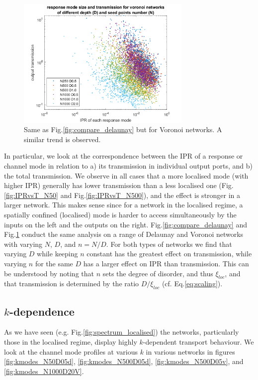 \begin{figure}[hbp]
  \centering
    \includegraphics[width=0.75\textwidth]{ch3/fig3/compare_voronoi.png}
    \caption{Same as Fig.\ref{fig:compare_delaunay} but for Voronoi networks. A similar trend is observed.} 
    \label{fig:compare_voronoi}
\end{figure}

In particular, we look at the correspondence between the IPR of a response or channel mode in relation to a) its transmission in individual output ports, and b) the total transmission. We observe in all cases that a more localised mode (with higher IPR) generally has lower transmission than a less localised one (Fig.\ref{fig:IPRvsT_N50} and Fig.\ref{fig:IPRvsT_N500}), and the effect is stronger in a larger network. This makes sense since for a network in the localised regime, a spatially confined (localised) mode is harder to access simultaneously by the inputs on the left and the outputs on the right.
Fig.\ref{fig:compare_delaunay} and Fig.\ref{fig:compare_voronoi} conduct the same analysis on a range of Delaunay and Voronoi networks with varying $N$, $D$, and $n=N/D$. For both types of networks we find that varying $D$ while keeping $n$ constant has the greatest effect on transmission, while varying $n$ for the same $D$ has a larger effect on IPR than transmission. This can be understood by noting that $n$ sets the degree of disorder, and thus $\xi_{loc}$, and that transmission is determined by the ratio $D/\xi_{loc}$ (cf. Eq.\ref{eq:scaling}).

\subsection{$k$-dependence}
As we have seen (e.g. Fig.\ref{fig:spectrum_localised}) the networks, particularly those in the localised regime, display highly $k$-dependent transport behaviour. We look at the channel mode profiles at various $k$ in various networks in figures \ref{fig:kmodes_N50D05d}, \ref{fig:kmodes_N500D05d}, \ref{fig:kmodes_N500D05v}, and \ref{fig:kmodes_N1000D20V}.


